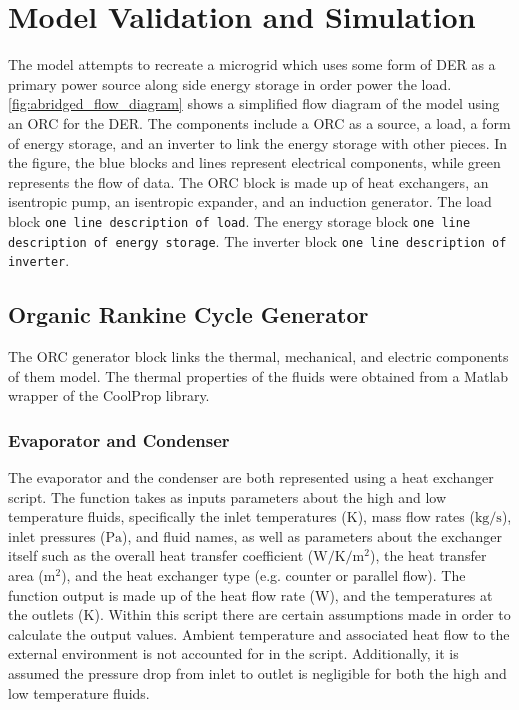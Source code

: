 \chapter{Model Validation and Simulation}
\label{ch:model}

The model attempts to recreate a microgrid which uses some form of DER as a primary power source along side energy storage in order power the load. \autoref{fig:abridged_flow_diagram} shows a simplified flow diagram of the model using an ORC for the DER. The components include a ORC as a source, a load, a form of energy storage, and an inverter to link the energy storage with other pieces. In the figure, the blue blocks and lines represent electrical components, while green represents the flow of data. The ORC block is made up of heat exchangers, an isentropic pump, an isentropic expander, and an induction generator. 
The load block \verb|one line description of load|. 
The energy storage block \verb|one line description of energy storage|. 
The inverter block \verb|one line description of inverter|.



\section{Organic Rankine Cycle Generator}
The ORC generator block links the thermal, mechanical, and electric components of them model. The thermal properties of the fluids were obtained from a Matlab wrapper of the CoolProp library. \cite{Bell2014}
\subsection{Evaporator and Condenser}
The evaporator and the condenser are both represented using a heat exchanger script.  The function takes as inputs parameters about the high and low temperature fluids, specifically the inlet temperatures ($\si{\kelvin}$), mass flow rates ($\si{\kilogram\per\second} $), inlet pressures ($\si{\pascal}$), and fluid names, as well as parameters about the exchanger itself such as the overall heat transfer coefficient ($\si{\watt\per\kelvin\per\meter\squared}$), the heat transfer area ($\si{\meter\squared}$), and the heat exchanger type (e.g. counter or parallel flow). The function output is made up of the heat flow rate ($\si{\watt}$), and the temperatures at the outlets ($\si{\kelvin}$). Within this script there are certain assumptions made in order to calculate the output values. Ambient temperature and associated heat flow to the external environment is not accounted for in the script. Additionally, it is assumed the pressure drop from inlet to outlet is negligible for both the high and low temperature fluids.

